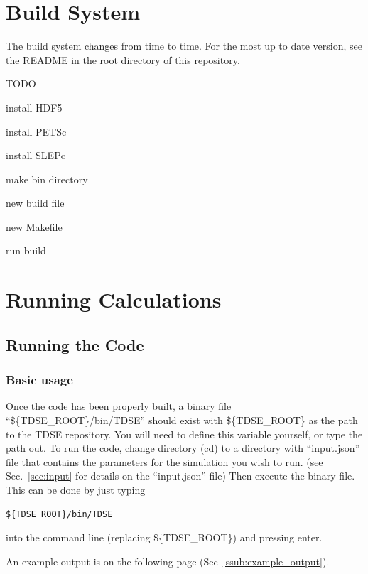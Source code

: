 \documentclass{article}
\begin{document}


\section{Build System} %
\label{sec:build_system}
The build system changes from time to time. For the most up to date version, see the README in the root directory of this repository.

TODO

install HDF5

install PETSc

install SLEPc

make bin directory

new build file

new Makefile

run build

\section{Running Calculations} %
\label{sec:running_tdse_and_best_practices}
\subsection{Running the Code} %
\label{sub:running_the_code}
\subsubsection{Basic usage} %
\label{ssub:basic_usage}
Once the code has been properly built, a binary file ``\$\{TDSE\_ROOT\}/bin/TDSE'' should exist with \$\{TDSE\_ROOT\} as the path to the TDSE repository. You will need to define this variable yourself, or type the path out. To run the code, change directory (cd) to a directory with ``input.json'' file that contains the parameters for the simulation you wish to run. (see Sec.~\ref{sec:input} for details on the ``input.json'' file) Then execute the binary file. This can be done by just typing
\begin{verbatim}
${TDSE_ROOT}/bin/TDSE
\end{verbatim}
into the command line (replacing \$\{TDSE\_ROOT\}) and pressing enter.

An example output is on the following page (Sec~\ref{ssub:example_output}).
\newpage
\end{document}

